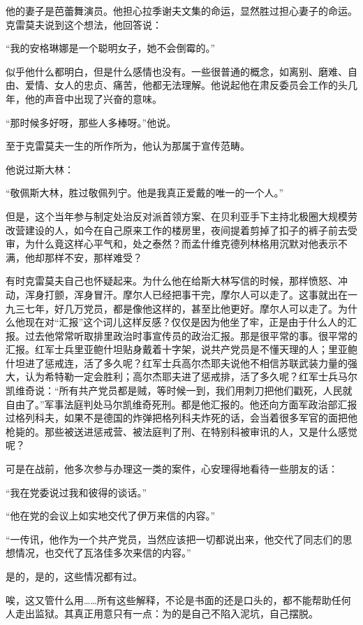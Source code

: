 他的妻子是芭蕾舞演员。他担心拉季谢夫文集的命运，显然胜过担心妻子的命运。克雷莫夫说到这个想法，他回答说：

“我的安格琳娜是一个聪明女子，她不会倒霉的。”

似乎他什么都明白，但是什么感情也没有。一些很普通的概念，如离别、磨难、自由、爱情、女人的忠贞、痛苦，他都无法理解。他说起他在肃反委员会工作的头几年，他的声音中出现了兴奋的意味。

“那时候多好呀，那些人多棒呀。”他说。

至于克雷莫夫一生的所作所为，他认为那属于宣传范畴。

他说过斯大林：

“敬佩斯大林，胜过敬佩列宁。他是我真正爱戴的唯一的一个人。”

但是，这个当年参与制定处治反对派首领方案、在贝利亚手下主持北极圈大规模劳改营建设的人，如今在自己原来工作的楼房里，夜间提着剪掉了扣子的裤子前去受审，为什么竟这样心平气和，处之泰然？而孟什维克德列林格用沉默对他表示不满，他却那样不安，那样难受？

有时克雷莫夫自己也怀疑起来。为什么他在给斯大林写信的时候，那样愤怒、冲动，浑身打颤，浑身冒汗。摩尔人已经把事干完，摩尔人可以走了。这事就出在一九三七年，好几万党员，都是像他这样的，甚至比他更好。摩尔人可以走了。为什么他现在对“汇报”这个词儿这样反感？仅仅是因为他坐了牢，正是由于什么人的汇报。过去他常常听取排里政治时事宣传员的政治汇报。那是很平常的事。很平常的汇报。红军士兵里亚鲍什坦贴身戴着十字架，说共产党员是不懂天理的人；里亚鲍什坦进了惩戒连，活了多久呢？红军士兵高尔杰耶夫说他不相信苏联武装力量的强大，认为希特勒一定会胜利；高尔杰耶夫进了惩戒排，活了多久呢？红军士兵马尔凯维奇说：“所有共产党员都是贼，等时候一到，我们用刺刀把他们戳死，人民就自由了。”军事法庭判处马尔凯维奇死刑。都是他汇报的。他还向方面军政治部汇报过格列科夫，如果不是德国的炸弹把格列科夫炸死的话，会当着很多军官的面把他枪毙的。那些被送进惩戒营、被法庭判了刑、在特别科被审讯的人，又是什么感觉呢？

可是在战前，他多次参与办理这一类的案件，心安理得地看待一些朋友的话：

“我在党委说过我和彼得的谈话。”

“他在党的会议上如实地交代了伊万来信的内容。”

“一传讯，他作为一个共产党员，当然应该把一切都说出来，他交代了同志们的思想情况，也交代了瓦洛佳多次来信的内容。”

是的，是的，这些情况都有过。

唉，这又管什么用……所有这些解释，不论是书面的还是口头的，都不能帮助任何人走出监狱。其真正用意只有一点：为的是自己不陷入泥坑，自己摆脱。

